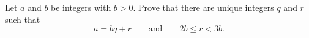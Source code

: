 Let $a$ and $b$ be integers with $b>0$. Prove that there are unique integers $q$ and $r$ such that
\[a=bq+r\qquad\text{and}\qquad 2b\le r<3b .\]
